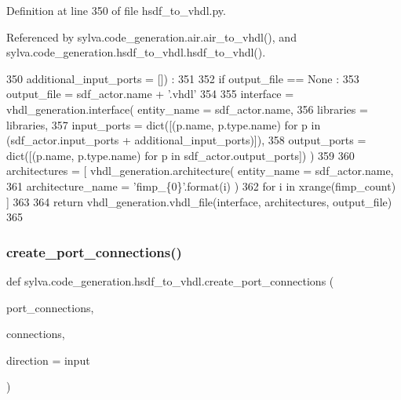 Definition at line 350 of file hsdf\+\_\+to\+\_\+vhdl.\+py.



Referenced by sylva.\+code\+\_\+generation.\+air.\+air\+\_\+to\+\_\+vhdl(), and sylva.\+code\+\_\+generation.\+hsdf\+\_\+to\+\_\+vhdl.\+hsdf\+\_\+to\+\_\+vhdl().


\begin{DoxyCode}
350   additional\_input\_ports = []) :
351 
352   \textcolor{keywordflow}{if} output\_file == \textcolor{keywordtype}{None} :
353     output\_file = sdf\_actor.name + \textcolor{stringliteral}{'.vhdl'}
354 
355   interface = vhdl\_generation.interface( entity\_name = sdf\_actor.name,
356     libraries = libraries,
357     input\_ports = dict([(p.name, p.type.name) \textcolor{keywordflow}{for} p \textcolor{keywordflow}{in} (sdf\_actor.input\_ports + additional\_input\_ports)]),
358     output\_ports = dict([(p.name, p.type.name) \textcolor{keywordflow}{for} p \textcolor{keywordflow}{in} sdf\_actor.output\_ports]) )
359 
360   architectures = [ vhdl\_generation.architecture( entity\_name = sdf\_actor.name,
361     architecture\_name = \textcolor{stringliteral}{'fimp\_\{0\}'}.format(i) )
362     \textcolor{keywordflow}{for} i \textcolor{keywordflow}{in} xrange(fimp\_count) ]
363 
364   \textcolor{keywordflow}{return} vhdl\_generation.vhdl\_file(interface, architectures, output\_file)
365 \end{DoxyCode}
\mbox{\label{namespacesylva_1_1code__generation_1_1hsdf__to__vhdl_a32b4f40eadeb985a68674b401be7a1dc}} 
\subsubsection{\texorpdfstring{create\+\_\+port\+\_\+connections()}{create\_port\_connections()}}
{\footnotesize\ttfamily def sylva.\+code\+\_\+generation.\+hsdf\+\_\+to\+\_\+vhdl.\+create\+\_\+port\+\_\+connections (\begin{DoxyParamCaption}\item[{}]{port\+\_\+connections,  }\item[{}]{connections,  }\item[{}]{direction = {\ttfamily \textquotesingle{}input\textquotesingle{}} }\end{DoxyParamCaption})}

